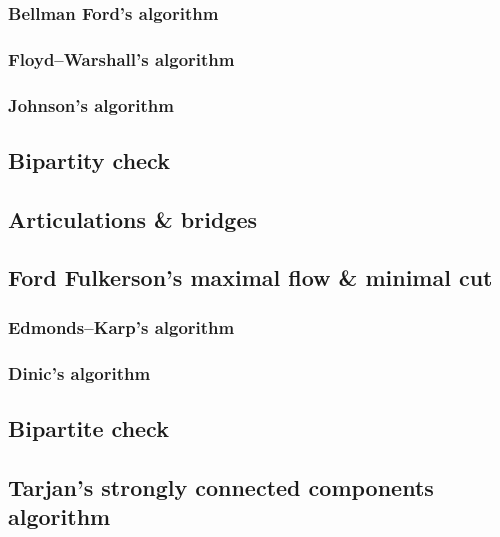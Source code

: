 \documentclass[a4paper]{article}
\begin{document}
\begin{multicols*}{3}
        \subsubsection{Bellman Ford's algorithm}
            
        \subsubsection{Floyd--Warshall's algorithm}
            
        \subsubsection{Johnson's algorithm}
            
    \subsection{Bipartity check}
        
    \subsection{Articulations \& bridges}
        
    \subsection{Ford Fulkerson's maximal flow \& minimal cut}
    \subsubsection{Edmonds--Karp's algorithm}
        
    \subsubsection{Dinic's algorithm}
        
    \subsection{Bipartite check}
        
    \subsection{Tarjan's strongly connected components algorithm}
        

\end{multicols*}
\end{document}
